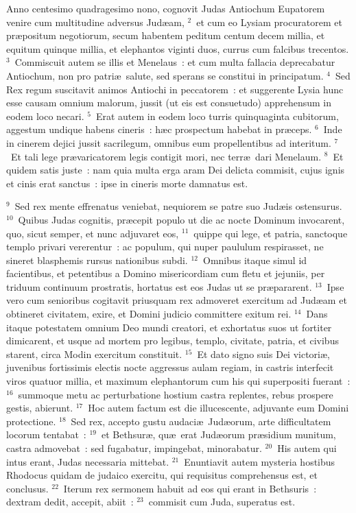 \lettrine[lines=3,image=true,loversize=0.05,lraise=-0.03]{A}{}nno centesimo quadragesimo nono, cognovit Judas Antiochum Eupatorem venire cum multitudine adversus Jud\ae am,
${}^{2}$~et cum eo Lysiam procuratorem et pr\ae positum negotiorum, secum habentem peditum centum decem millia, et equitum quinque millia, et elephantos viginti duos, currus cum falcibus trecentos.
${}^{3}$~Commiscuit autem se illis et Menelaus~: et cum multa fallacia deprecabatur Antiochum, non pro patri\ae\ salute, sed sperans se constitui in principatum.
${}^{4}$~Sed Rex regum suscitavit animos Antiochi in peccatorem~: et suggerente Lysia hunc esse causam omnium malorum, jussit (ut eis est consuetudo) apprehensum in eodem loco necari.
${}^{5}$~Erat autem in eodem loco turris quinquaginta cubitorum, aggestum undique habens cineris~: h\ae c prospectum habebat in pr\ae ceps.
${}^{6}$~Inde in cinerem dejici jussit sacrilegum, omnibus eum propellentibus ad interitum.
${}^{7}$~Et tali lege pr\ae varicatorem legis contigit mori, nec terr\ae\ dari Menelaum.
${}^{8}$~Et quidem satis juste~: nam quia multa erga aram Dei delicta commisit, cujus ignis et cinis erat sanctus~: ipse in cineris morte damnatus est.


${}^{9}$~Sed rex mente effrenatus veniebat, nequiorem se patre suo Jud\ae is ostensurus.
${}^{10}$~Quibus Judas cognitis, pr\ae cepit populo ut die ac nocte Dominum invocarent, quo, sicut semper, et nunc adjuvaret eos,
${}^{11}$~quippe qui lege, et patria, sanctoque templo privari vererentur~: ac populum, qui nuper paululum respirasset, ne sineret blasphemis rursus nationibus subdi.
${}^{12}$~Omnibus itaque simul id facientibus, et petentibus a Domino misericordiam cum fletu et jejuniis, per triduum continuum prostratis, hortatus est eos Judas ut se pr\ae pararent.
${}^{13}$~Ipse vero cum senioribus cogitavit priusquam rex admoveret exercitum ad Jud\ae am et obtineret civitatem, exire, et Domini judicio committere exitum rei.
${}^{14}$~Dans itaque potestatem omnium Deo mundi creatori, et exhortatus suos ut fortiter dimicarent, et usque ad mortem pro legibus, templo, civitate, patria, et civibus starent, circa Modin exercitum constituit.
${}^{15}$~Et dato signo suis Dei victori\ae , juvenibus fortissimis electis nocte aggressus aulam regiam, in castris interfecit viros quatuor millia, et maximum elephantorum cum his qui superpositi fuerant~:
${}^{16}$~summoque metu ac perturbatione hostium castra replentes, rebus prospere gestis, abierunt.
${}^{17}$~Hoc autem factum est die illucescente, adjuvante eum Domini protectione.
${}^{18}$~Sed rex, accepto gustu audaci\ae\ Jud\ae orum, arte difficultatem locorum tentabat~:
${}^{19}$~et Bethsur\ae , qu\ae\ erat Jud\ae orum pr\ae sidium munitum, castra admovebat~: sed fugabatur, impingebat, minorabatur.
${}^{20}$~His autem qui intus erant, Judas necessaria mittebat.
${}^{21}$~Enuntiavit autem mysteria hostibus Rhodocus quidam de judaico exercitu, qui requisitus comprehensus est, et conclusus.
${}^{22}$~Iterum rex sermonem habuit ad eos qui erant in Bethsuris~: dextram dedit, accepit, abiit~:
${}^{23}$~commisit cum Juda, superatus est.

